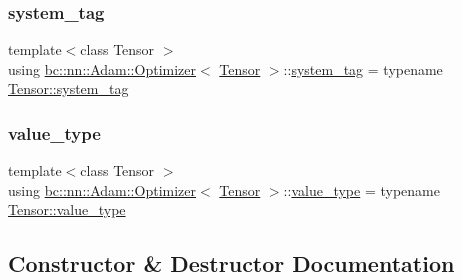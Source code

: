 \subsubsection{\texorpdfstring{system\+\_\+tag}{system\_tag}}
{\footnotesize\ttfamily template$<$class Tensor $>$ \\
using \hyperlink{structbc_1_1nn_1_1Adam_1_1Optimizer}{bc\+::nn\+::\+Adam\+::\+Optimizer}$<$ \hyperlink{namespacebc_a659391e47ab612be3ba6c18cf9c89159}{Tensor} $>$\+::\hyperlink{structbc_1_1nn_1_1Adam_1_1Optimizer_aaa59035413615a398b1a0b8738078a54}{system\+\_\+tag} =  typename \hyperlink{classbc_1_1tensors_1_1Tensor__Base_aef100d466be9075c6682ae9a2d2bd66d}{Tensor\+::system\+\_\+tag}}

\mbox{\label{structbc_1_1nn_1_1Adam_1_1Optimizer_a6c0f45fad49cbec9368339576806cb75}} 
\subsubsection{\texorpdfstring{value\+\_\+type}{value\_type}}
{\footnotesize\ttfamily template$<$class Tensor $>$ \\
using \hyperlink{structbc_1_1nn_1_1Adam_1_1Optimizer}{bc\+::nn\+::\+Adam\+::\+Optimizer}$<$ \hyperlink{namespacebc_a659391e47ab612be3ba6c18cf9c89159}{Tensor} $>$\+::\hyperlink{structbc_1_1nn_1_1Adam_1_1Optimizer_a6c0f45fad49cbec9368339576806cb75}{value\+\_\+type} =  typename \hyperlink{classbc_1_1tensors_1_1Tensor__Base_ae7e5c0119f62f43ef74c5a463d3eaf13}{Tensor\+::value\+\_\+type}}



\subsection{Constructor \& Destructor Documentation}
\mbox{\label{structbc_1_1nn_1_1Adam_1_1Optimizer_a726192bbb8742fb5b00a7e0107754c14}} 
